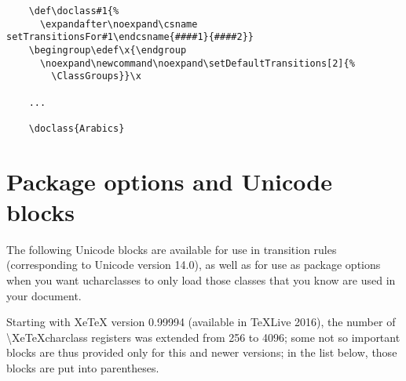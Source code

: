 \documentclass{article}
\begin{document}
    \disableTransitionRules
    \begin{verbatim}
    \def\doclass#1{%
      \expandafter\noexpand\csname setTransitionsFor#1\endcsname{####1}{####2}}
    \begingroup\edef\x{\endgroup
      \noexpand\newcommand\noexpand\setDefaultTransitions[2]{%
        \ClassGroups}}\x

    ...

    \doclass{Arabics}
    \end{verbatim}
    \enableTransitionRules

  \pagebreak

  \section{Package options and Unicode blocks}

    The following Unicode blocks are available for use in transition rules (corresponding to Unicode version 14.0), as well as for use as package options when you want ucharclasses to only load those classes that you know are used in your document.

    Starting with XeTeX version 0.99994 (available in TeXLive 2016), the number of \textbackslash XeTeXcharclass registers was extended from 256 to 4096; some not so important blocks are thus provided only for this and newer versions; in the list below, those blocks are put into parentheses.
\end{document}
